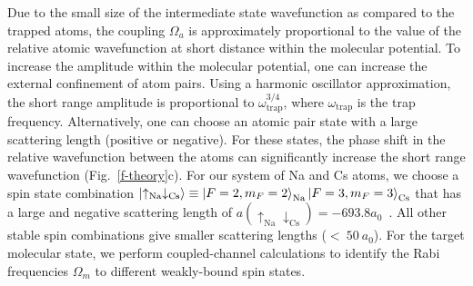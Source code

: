 \documentclass[aps,prl,twocolumn,superscriptaddress]{revtex4-1}
\newcommand{\Na}{\mathrm{Na}}
\newcommand{\Cs}{\mathrm{Cs}}
\begin{document}
Due to the small size of the intermediate state wavefunction as compared to the trapped atoms,
the coupling $\Omega_a$ is approximately proportional to
the value of the relative atomic wavefunction at short distance
within the molecular potential.
To increase the amplitude within the molecular potential,
one can increase the external confinement of atom pairs.
Using a harmonic oscillator approximation,
the short range amplitude is proportional to $ \omega_{\text{trap}}^{3/4} $,
where $ \omega_{\text{trap}} $ is the trap frequency.
Alternatively, one can choose an atomic pair state with a large scattering length
(positive or negative).
For these states, the phase shift in the relative wavefunction
between the atoms can significantly increase the short range wavefunction (Fig.~\ref{f-theory}c).
For our system of Na and Cs atoms,
we choose a spin state combination $\ket{\uparrow_{\Na} \downarrow_{\Cs}}\equiv \ket{F=2,m_F=2}_{\Na}\ket{F=3,m_F=3}_{\Cs}$ that has a large and negative scattering length of
$ a(\uparrow_{\Na} \downarrow_{\Cs}) = -693.8a_0$~\cite{Hood2019}.
All other stable spin combinations give smaller scattering lengths ($<~50~a_0$).
For the target molecular state, we perform coupled-channel calculations
to identify the Rabi frequencies $\Omega_m$ to different weakly-bound spin states.
\end{document}
